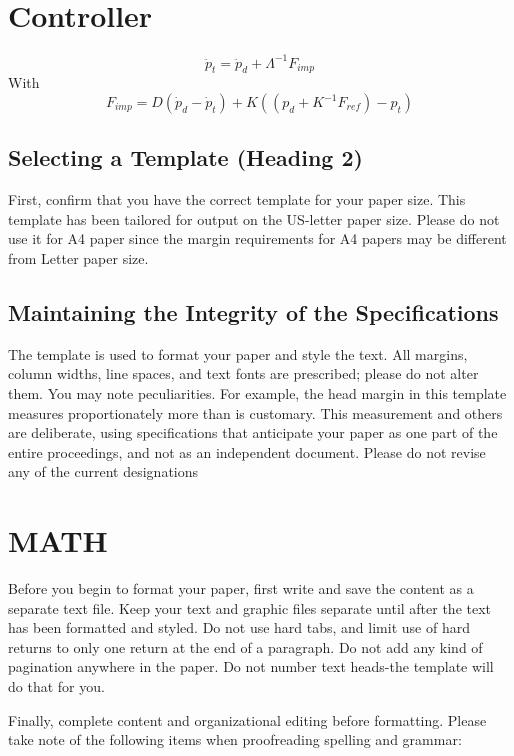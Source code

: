 \documentclass[a4paper, 10pt, conference]{ieeeconf}
\begin{document}
    \section{Controller}
    $$\ddot{p}_t = \ddot{p}_d + \Lambda^{-1}F_{imp}$$
    With 
    $$F_{imp} = D (\dot{p}_d-\dot{p}_t) + K((p_d+K^{-1}F_{ref})-p_t) $$


    \subsection{Selecting a Template (Heading 2)}

    First, confirm that you have the correct template for your paper size. This template has been tailored for output on the US-letter paper size. Please do not use it for A4 paper since the margin requirements for A4 papers may be different from Letter paper size.

    \subsection{Maintaining the Integrity of the Specifications}

    The template is used to format your paper and style the text. All margins, column widths, line spaces, and text fonts are prescribed; please do not alter them. You may note peculiarities. For example, the head margin in this template measures proportionately more than is customary. This measurement and others are deliberate, using specifications that anticipate your paper as one part of the entire proceedings, and not as an independent document. Please do not revise any of the current designations

    \section{MATH}

    Before you begin to format your paper, first write and save the content as a separate text file. Keep your text and graphic files separate until after the text has been formatted and styled. Do not use hard tabs, and limit use of hard returns to only one return at the end of a paragraph. Do not add any kind of pagination anywhere in the paper. Do not number text heads-the template will do that for you.

    Finally, complete content and organizational editing before formatting. Please take note of the following items when proofreading spelling and grammar:
\end{document}
